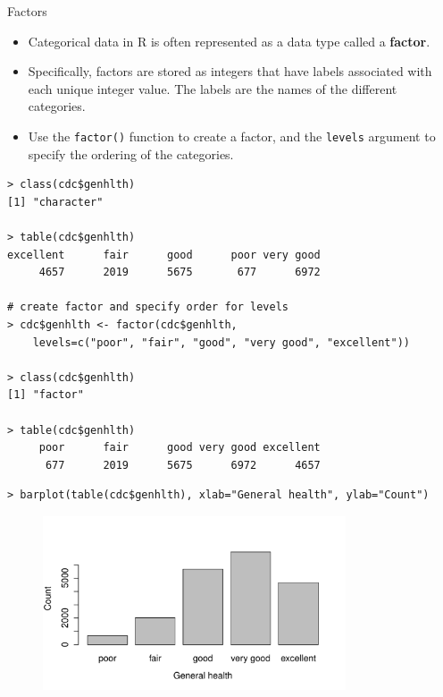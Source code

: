 \documentclass[10pt]{beamer}
\begin{document}
\begin{frame}{Factors}
\begin{itemize}
\item Categorical data in R is often represented as a data type called a \textbf{factor}.
\vspace{5pt}
\item Specifically, factors are stored as integers that have labels associated with each unique integer value.  The labels are the names of the different categories.
\vspace{5pt}
\item Use the \texttt{factor()} function to create a factor, and the \texttt{levels} argument to specify the ordering of the categories.
\end{itemize}
\end{frame}

\begin{frame}[fragile]
\small
\begin{verbatim}
> class(cdc$genhlth)
[1] "character"

> table(cdc$genhlth)
excellent      fair      good      poor very good 
     4657      2019      5675       677      6972 

# create factor and specify order for levels  
> cdc$genhlth <- factor(cdc$genhlth, 
    levels=c("poor", "fair", "good", "very good", "excellent"))
    
> class(cdc$genhlth)
[1] "factor"

> table(cdc$genhlth)
     poor      fair      good very good excellent 
      677      2019      5675      6972      4657 
\end{verbatim}
\end{frame}

\begin{frame}[fragile]
\small
\begin{verbatim}
> barplot(table(cdc$genhlth), xlab="General health", ylab="Count")
\end{verbatim}
\begin{figure}[htbp]
\centering
\includegraphics[width=0.8\textwidth]{figure/barplot_genhealth.pdf}
\end{figure}
\end{frame}
\end{document}
